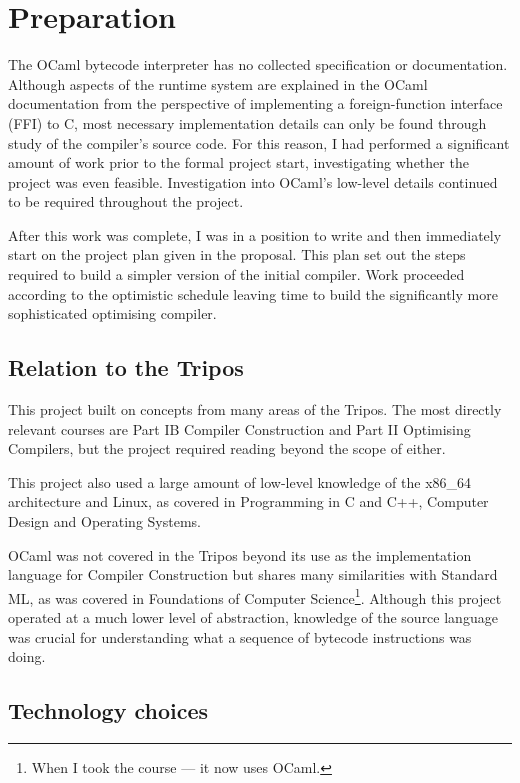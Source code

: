 \chapter{Preparation}

The OCaml bytecode interpreter has no collected specification or documentation. Although aspects of
the runtime system are explained in the OCaml documentation from the perspective of implementing a
foreign-function interface (FFI) to C, most necessary implementation details can only be found
through study of the compiler's source code. For this reason, I had performed a significant amount
of work prior to the formal project start, investigating whether the project was even feasible.
Investigation into OCaml's low-level details continued to be required throughout the project.

After this work was complete, I was in a position to write and then immediately start on the
project
plan given in the proposal. This plan set out the steps required to build a simpler version of the
initial compiler. Work proceeded according to the optimistic schedule leaving time to build the
significantly more sophisticated optimising compiler.

\section{Relation to the Tripos}

This project built on concepts from many areas of the Tripos. The most directly
relevant courses are Part IB Compiler Construction and Part II Optimising Compilers, but the
project required
reading beyond the scope of either.

This project also used a large amount of low-level knowledge of the x86\_64 architecture and Linux,
as covered in Programming in C and C++, Computer Design and Operating Systems.

OCaml was not covered in the Tripos beyond its use as the implementation language for Compiler
Construction but shares many similarities with Standard ML, as was covered in Foundations of
Computer
Science\footnote{When I took the course --- it now uses OCaml.}. Although this project operated at
a
much
lower level of abstraction, knowledge of the
source language was crucial for understanding what a sequence of bytecode instructions was doing.

\section{Technology choices}

